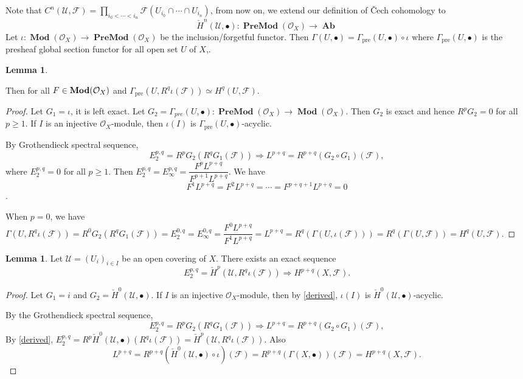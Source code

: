 \documentclass{amsart}
\numberwithin{equation}{section}
\theoremstyle{plain}
\theoremstyle{definition}
\newtheorem{lem}[equation]{Lemma}
\DeclareMathOperator{\Ab}{\mathbf{Ab}}
\DeclareMathOperator{\Mod}{\mathbf{Mod}}
\DeclareMathOperator{\Pre}{pre}
\DeclareMathOperator{\PreAb}{\mathbf{PreAb}}
\DeclareMathOperator{\PreMod}{\mathbf{PreMod}}
\begin{document}
Note that $ C^n(\mathscr U, \mathscr F)=\prod\limits_{i_0<\cdots<i_n}\mathscr F(U_{i_0}\cap\cdots\cap U_{i_n}) $, from now on, we extend our definition of \v{C}ech cohomology to \[\check{H}^n(\mathscr U, \bullet): \PreMod(\mathcal O_X)\to \Ab\]
Let $ \iota:\Mod(\mathcal O_X)\to\PreMod(\mathcal O_X) $ be the inclusion/forgetful functor. 
Then $ \Gamma(U,\bullet)=\Gamma_{\Pre}(U, \bullet)\circ\iota $ where $ \Gamma_{\Pre}(U, \bullet)$ is the presheaf global section functor for all open set $ U $ of $ X $,. 

\begin{lem}\label{3.5}
	
	Then for all $ \mathscr \mathscr F\in\Mod(\mathcal O_X) $ and $ \Gamma_{\Pre}(U, R^q\iota (\mathscr F))\simeq H^q(U, \mathscr F) $. 
\end{lem}

\begin{proof}
	Let $ G_1=\iota $, it is left exact. 
	Let $ G_2=\Gamma_{pre}(U, \bullet):\PreMod(\mathcal O_X)\to \Mod(\mathcal O_X) $. 
	Then $ G_2 $ is exact and hence $ R^pG_2=0 $ for all $ p\ge 1 $. 
	If $ I $ is an injective $ \mathcal O_X $-module, then $ \iota(I) $ is $ \Gamma_{\Pre}(U, \bullet) $-acyclic. 
	
	By Grothendieck spectral sequence, $$ E_2^{p,q}=R^pG_2(R^qG_1(\mathscr F))\Rightarrow L^{p+q}=R^{p+q}(G_2\circ G_1)(\mathscr F), $$
	where $ E_2^{p,q}=0 $ for all $ p\ge 1 $. 
	Then $ E_2^{p,q}=E_{\infty}^{p,q}=\dfrac{F^pL^{p+q}}{F^{p+1}L^{p+q}} $. 
	We have $$ F^1L^{p+q}=F^2L^{p+q}=\cdots=F^{p+q+1}L^{p+q}=0 $$. 
	
	When $ p=0 $, we have $ \Gamma(U, R^q\iota (\mathscr F)) =R^0G_2(R^qG_1(\mathscr F))=E_2^{0,q}=E_{\infty}^{0,q}=\dfrac{F^0L^{p+q}}{F^1L^{p+q}}=L^{p+q}=R^q(\Gamma(U,\iota(\mathscr F)))=R^q(\Gamma(U,\mathscr F))=H^q(U, \mathscr F)$. 	
\end{proof}




\begin{lem}\label{3.4}
	Let $ \mathscr U=(U_i)_{i\in I} $ be an open covering of $ X $. 
	There exists an exact sequence 
	\[E_2^{p,q}=\check{H}^p(\mathscr U, R^q\iota (\mathscr F))\Rightarrow H^{p+q}(X, \mathscr F).\]
\end{lem}

\begin{proof}
	Let $ G_1=i $ and $ G_2=\check{H}^0(\mathscr U, \bullet)$. 
	If $ I $ is an injective $ \mathcal O_X $-module, then by \cref{derived}, $ \iota(I) $ is $ \check{H}^0(\mathscr U, \bullet) $-acyclic. 
	
	By the Grothendieck spectral sequence, $$ E_2^{p,q}=R^pG_2(R^qG_1(\mathscr F))\Rightarrow L^{p+q}=R^{p+q}(G_2\circ G_1)(\mathscr F), $$
	By \cref{derived}, $ E_2^{p,q}=R^p\check{H}^0(\mathscr U,\bullet)( R^q\iota (\mathscr F))=\check{H}^p(\mathscr U, R^q\iota (\mathscr F))$. Also 
	 $$ L^{p+q}=R^{p+q}(\check{H}^0(\mathscr U, \bullet)\circ\iota)(\mathscr F)=R^{p+q}(\Gamma(X,\bullet))(\mathscr F)=H^{p+q}(X,\mathscr F).$$
\end{proof}
\end{document}
